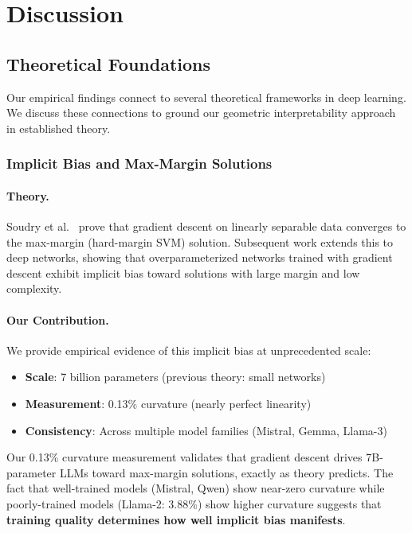\documentclass[11pt]{article}
\begin{document}
\section{Discussion}
\label{sec:discussion}

\subsection{Theoretical Foundations}
\label{sec:theory}

Our empirical findings connect to several theoretical frameworks in deep learning. We discuss these connections to ground our geometric interpretability approach in established theory.

\subsubsection{Implicit Bias and Max-Margin Solutions}

\paragraph{Theory.}
Soudry et al.\ \citep{soudry2018implicit} prove that gradient descent on linearly separable data converges to the max-margin (hard-margin SVM) solution. Subsequent work \citep{ji2019implicit} extends this to deep networks, showing that overparameterized networks trained with gradient descent exhibit implicit bias toward solutions with large margin and low complexity.

\paragraph{Our Contribution.}
We provide empirical evidence of this implicit bias at unprecedented scale:
\begin{itemize}
    \item \textbf{Scale}: 7 billion parameters (previous theory: small networks)
    \item \textbf{Measurement}: 0.13\% curvature (nearly perfect linearity)
    \item \textbf{Consistency}: Across multiple model families (Mistral, Gemma, Llama-3)
\end{itemize}

Our 0.13\% curvature measurement validates that gradient descent drives 7B-parameter LLMs toward max-margin solutions, exactly as theory predicts. The fact that well-trained models (Mistral, Qwen) show near-zero curvature while poorly-trained models (Llama-2: 3.88\%) show higher curvature suggests that \textbf{training quality determines how well implicit bias manifests}.
\end{document}
